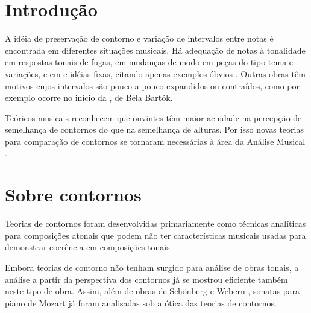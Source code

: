 \chapter{Introdução}
\label{cha:introducao}

A idéia de preservação de contorno e variação de intervalos entre
notas é encontrada em diferentes situações musicais. Há adequação de
notas à tonalidade em respostas tonais de fugas, em mudanças de modo
em peças do tipo tema e variações, e em  e idéias
fixas, citando apenas exemplos óbvios
\cite[p. 29]{morris87:composition}. Outras obras têm motivos cujos
intervalos são pouco a pouco expandidos ou contraídos, como por
exemplo ocorre no início da , de Béla Bartók.

Teóricos musicais reconhecem que ouvintes têm maior acuidade na
percepção de semelhança de contornos do que na semelhança de
alturas. Por isso novas teorias para comparação de contornos se
tornaram necessárias à área da Análise Musical
\cite[p. 226]{marvin.ea87:relating}.

\chapter{Sobre contornos}
\label{cha:sobre-contornos}





Teorias de contornos foram desenvolvidas primariamente como técnicas
analíticas para composições atonais que podem não ter características
musicais usadas para demonstrar coerência em composições tonais
\cite[p. 1]{beard03:contour}.

Embora teorias de contorno não tenham surgido para análise de obras
tonais, a análise a partir da perspectiva dos contornos já se mostrou
eficiente também neste tipo de obra. Assim, além de obras de Schönberg
\cite{friedmann85:methodology} e Webern \cite{clifford95:contour},
sonatas para piano de Mozart \cite{beard03:contour} já foram
analisadas sob a ótica das teorias de contornos.

